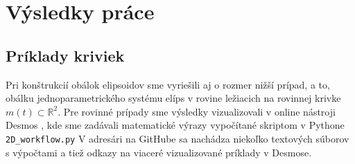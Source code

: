 \chapter{Výsledky práce}

\section{Príklady kriviek}
Pri konštrukcií obálok elipsoidov sme vyriešili aj o rozmer nižší prípad, a to, obálku jednoparametrického systému elíps v rovine ležiacich na rovinnej krivke $m(t) \subset \mathbb{R}^2$. Pre rovinné prípady sme výsledky vizualizovali v online nástroji Desmos \cite{Desmos}, kde sme zadávali matematické výrazy vypočítané skriptom v Pythone \verb|2D_workflow.py| V adresári na GitHube sa nachádza niekoľko textových súborov s výpočtami a tiež odkazy na viaceré vizualizované príklady v Desmose.

